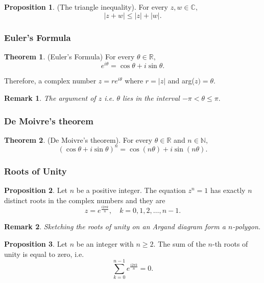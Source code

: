 \documentclass[12pt, a4paper]{article}
\newtheorem*{remark}{Remark}
\theoremstyle{definition}
\newtheorem{theorem}{Theorem}[section]
\newtheorem{proposition}{Proposition}
\theoremstyle{plain}
\newcommand{\bb}[1]{\mathbb{#1}}
\begin{document}
\begin{proposition}(The triangle inequality). For every $z,w \in \bb{C},$ $$|z+w|\leq|z|+|w|.$$ \end{proposition}

\subsubsection{Euler's Formula}

\begin{theorem}(Euler's Formula) For every $\theta \in \bb{R},$ $$e^{i\theta} = \cos{\theta}+i\sin{\theta}.$$ \end{theorem}

Therefore, a complex number $z=re^{i\theta}$ where $r=|z|$ and arg($z)=\theta.$

\begin{remark}
The argument of $z$ i.e. $\theta$ lies in the interval $-\pi<\theta\leq \pi.$
\end{remark}

\subsubsection{De Moivre's theorem}

\begin{theorem}(De Moivre's theorem). For every $\theta \in \bb{R}$ and $n \in \bb{N},$ $$(\cos{\theta}+i\sin{\theta})^n=\cos(n\theta)+i\sin(n\theta).$$ \end{theorem}

\subsubsection{Roots of Unity}

\begin{proposition} Let $n$ be a positive integer. The equation $z^n=1$ has exactly $n$ distinct roots in the complex numbers and they are $$z=e^{\frac{i2\pi k}{n}}, \quad k=0,1,2,\ldots,n-1.$$ \end{proposition}

\begin{remark}
Sketching the roots of unity on an Argand diagram form a $n$-polygon.
\end{remark}
	
\begin{proposition} Let $n$ be an integer with $n\geq2.$ The sum of the $n$-th roots of unity is equal to zero, i.e. $$\sum_{k=0}^{n-1} e^{\frac{i2\pi k}{n}}=0.$$ \end{proposition}
\end{document}
